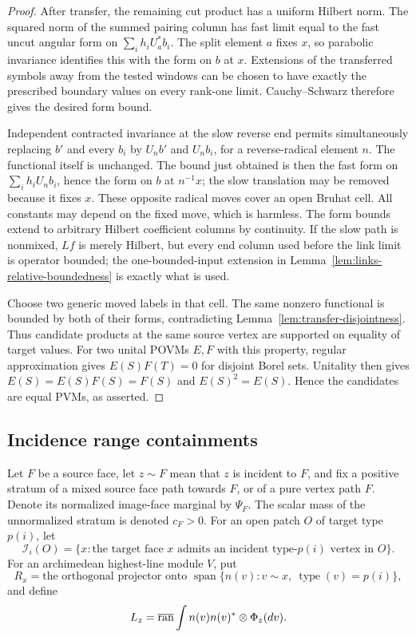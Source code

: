 \begin{proof}
After transfer, the remaining cut product has a uniform Hilbert norm.
The squared norm of the summed pairing column has fast limit equal
to the fast uncut angular form on
$\sum_i h_i U_a^*b_i$. The split element $a$ fixes $x$, so parabolic
invariance identifies this with the form on $b$ at $x$. Extensions of
the transferred symbols away from the tested windows can be chosen
to have exactly the prescribed boundary values on every rank-one
limit. Cauchy--Schwarz therefore gives the desired form bound.

Independent contracted invariance at the slow reverse end permits
simultaneously replacing $b'$ and every $b_i$ by $U_n b'$ and
$U_n b_i$, for a reverse-radical element $n$. The functional itself
is unchanged. The bound just obtained is then the fast form on
$\sum_i h_iU_n b_i$, hence the form on $b$ at $n^{-1}x$; the slow
translation may be removed because it fixes $x$. These opposite
radical moves cover an open Bruhat cell. All constants may depend on
the fixed move, which is harmless. The form bounds extend to
arbitrary Hilbert coefficient columns by continuity. If the slow
path is nonmixed, $Lf$ is merely Hilbert, but every end column used
before the link limit is operator bounded; the one-bounded-input
extension in Lemma~\ref{lem:links-relative-boundedness} is exactly what is used.

Choose two generic moved labels in that cell. The same nonzero
functional is bounded by both of their forms, contradicting
Lemma~\ref{lem:transfer-disjointness}. Thus candidate products at the
same source vertex are supported on equality of target values.
For two unital POVMs $E,F$ with this property, regular approximation
gives $E(S)F(T)=0$ for disjoint Borel sets. Unitality then gives
$E(S)=E(S)F(S)=F(S)$ and $E(S)^2=E(S)$. Hence the candidates are equal
PVMs, as asserted.
\end{proof}

\subsection{Incidence range containments}

Let $F$ be a source face, let $z\sim F$ mean that $z$ is incident to
$F$, and fix a positive stratum of a mixed source face path towards $F$, or
of a pure vertex path $F$. Denote its normalized image-face marginal
by $\Psi_F$. The scalar mass of the unnormalized stratum is denoted
$c_F>0$. For an open patch $O$ of target type $p(i)$, let
\[
 \mathcal I_i(O)=\{x:\text{the target face }x
       \text{ admits an incident type-}p(i)\text{ vertex in }O\}.
\]
For an archimedean highest-line module $V$, put
\[
 R_x=\text{the orthogonal projector onto }
       \operatorname{span}\{n(v):v\sim x,\ \operatorname{type}(v)=p(i)\},
\]
and define
\begin{equation}
 L_z=\overline{\operatorname{ran}}\int n(v)n(v)^*\otimes\Phi_z(dv).
 \label{eq:transfer-Lz}
\end{equation}

